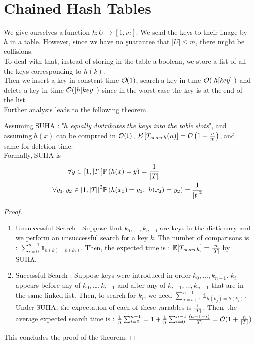 \documentclass[12pt]{cours}
\begin{document}
\section{Chained Hash Tables}
We give ourselves a function $h : U \rightarrow \left[1, m\right]$. We send the keys to their image by $h$ in a table. However, since we have no guarantee that $\left|U\right| \leq m$, there might be collisions.\\
To deal with that, instead of storing in the table a boolean, we store a list of all the keys corresponding to $h(k)$. \\
Then we insert a key in constant time $\mathcal{O}(1)$, search a key in time $\mathcal{O}(\left|h[key]\right|)$ and delete a key in time $\mathcal{O}(\left|h[key]\right|)$ since in the worst case the key is at the end of the list.\\

Further analysis leads to the following theorem.
\begin{theorem}
    Assuming SUHA : "\textit{$h$ equally distributes the keys into the table slots}", and assuming $h(x)$ can be computed in $\mathcal{O}(1)$, $E\left[T_{search}(n)\right] = \mathcal{O}\left(1 + \frac{n}{m}\right)$, and same for deletion time. \\
    Formally, SUHA is :
    \[
        \begin{aligned}
            \forall y \in \left[1, \left|T\right|\right]                & \mathbb{P}\left(h(x) = y\right) = \frac{1}{\left|T\right|}                                \\
            \forall y_{1}, y_{2} \in \left[1, \left|T\right|\right]^{2} & \mathbb{P}\left(h(x_{1}) = y_{1},\ h(x_{2}) = y_{2}\right) = \frac{1}{\left|t\right|^{2}}
        \end{aligned}
    \]
\end{theorem}
\begin{proof}
    \begin{enumerate}
        \item Unsuccessful Search : Suppose that $k_{0}, \ldots, k_{n-1}$ are keys in the dictionary and we perform an unsuccessful search for a key $k$.
              The number of comparisons is : $\sum_{i = 0}^{n-1} \mathbb{1}_{h(k) = h(k_{i})}$. Then, the expected time is : $\mathbb{E}[T_{search}] = \frac{n}{\left|T\right|}$ by SUHA.
        \item Successful Search : Suppose keys were introduced in order $k_{0}, \ldots, k_{n-1}$. $k_{i}$ appears before any of $k_{0}, \ldots, k_{i-1}$ and after any of $k_{i+1}, \ldots, k_{n-1}$ that are in the same linked list. Then, to search for $k_{i}$, we need $\sum_{j = i + 1}^{n- 1} \mathbb{1}_{h(k_{j}) = h(k_{i})}$. Under SUHA, the expectation of each of these variables is $\frac{1}{\left|T\right|}$. Then, the average expected search time is : $\frac{1}{n}\sum_{i = 0}^{n-1} = 1 + \frac{1}{n}\sum_{i = 0}^{n-1}\frac{(n-1-i)}{\left|T\right|} = \mathcal{O}(1 + \frac{n}{\left|T\right|})$
    \end{enumerate}
    This concludes the proof of the theorem.
\end{proof}
\end{document}
